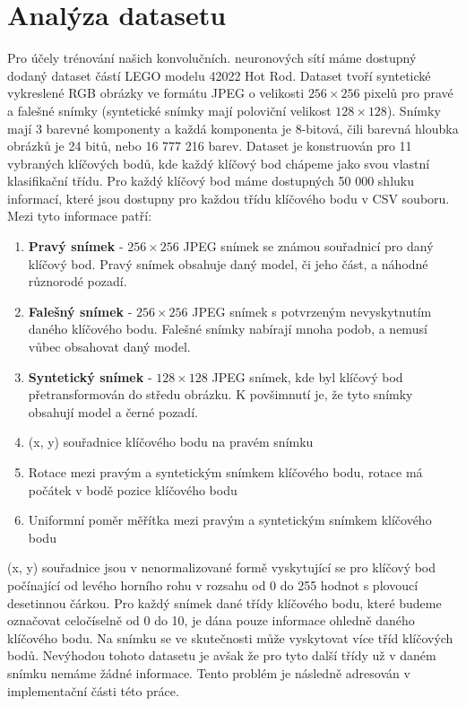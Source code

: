 \section{Analýza datasetu}
\label{sec:Chapter31}
Pro účely trénování našich konvolučních. neuronových sítí máme dostupný dodaný dataset částí LEGO modelu 42022 Hot Rod. Dataset tvoří syntetické vykreslené RGB obrázky ve formátu JPEG o velikosti $256\times256$ pixelů pro pravé a falešné snímky (syntetické snímky mají poloviční velikost $128\times128$). Snímky mají 3 barevné komponenty a každá komponenta je 8-bitová, čili barevná hloubka obrázků je 24 bitů, nebo 16 777 216 barev. Dataset je konstruován pro 11 vybraných klíčových bodů, kde každý klíčový bod chápeme jako svou vlastní klasifikační třídu. Pro každý klíčový bod máme dostupných 50 000 shluku informací, které jsou dostupny pro každou třídu klíčového bodu v CSV souboru. Mezi tyto informace patří:
\begin{enumerate}
  \item \textbf{Pravý snímek} - $256\times256$ JPEG snímek se známou souřadnicí pro daný klíčový bod. Pravý snímek obsahuje daný model, či jeho část, a náhodné různorodé pozadí.
  \item \textbf{Falešný snímek} - $256\times256$ JPEG snímek s potvrzeným nevyskytnutím daného klíčového bodu. Falešné snímky nabírají mnoha podob, a nemusí vůbec obsahovat daný model.
  \item \textbf{Syntetický snímek} - $128\times128$ JPEG snímek, kde byl klíčový bod přetransformován do středu obrázku. K povšimnutí je, že tyto snímky obsahují model a černé pozadí.
  \item (x, y) souřadnice klíčového bodu na pravém snímku
  \item Rotace mezi pravým a syntetickým snímkem klíčového bodu, rotace má počátek v bodě pozice klíčového bodu
  \item Uniformní poměr měřítka mezi pravým a syntetickým snímkem klíčového bodu
\end{enumerate}

(x, y) souřadnice jsou v nenormalizované formě vyskytující se pro klíčový bod počínající od levého horního rohu v rozsahu od 0 do 255 hodnot s plovoucí desetinnou čárkou. Pro každý snímek dané třídy klíčového bodu, které budeme označovat celočíselně od 0 do 10, je dána pouze informace ohledně daného klíčového bodu. Na snímku se ve skutečnosti může vyskytovat více tříd klíčových bodů. Nevýhodou tohoto datasetu je avšak že pro tyto další třídy už v daném snímku nemáme žádné informace. Tento problém je následně adresován v implementační části této práce.



